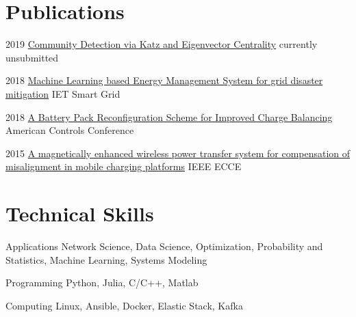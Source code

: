\documentclass{tccv}
\begin{document}
\section{Publications}
\begin{yearlist}
	\item{2019}
	{\href{https://arxiv.org/abs/1909.03916}{Community Detection via Katz and Eigenvector Centrality}}
	{currently unsubmitted}
	
	\item{2018}
	{\href{https://digital-library.theiet.org/content/journals/10.1049/iet-stg.2018.0043}{Machine Learning based Energy Management System for grid disaster mitigation}}
	{IET Smart Grid}
	
	\item{2018}
	{\href{https://ieeexplore.ieee.org/document/8431612}{A Battery Pack Reconfiguration Scheme for Improved Charge Balancing}}
	{American Controls Conference}
	
	\item{2015}
	{\href{http://ieeexplore.ieee.org/document/7309840/}{A magnetically enhanced wireless power transfer system for compensation of misalignment in mobile charging platforms}}
	{IEEE ECCE}
	
\end{yearlist}

\section{Technical Skills}
\begin{factlist}
\item {Applications}
	{Network Science, Data Science, Optimization, Probability and Statistics, Machine Learning, Systems Modeling}

\item{Programming}
    {Python, Julia, C/C++, Matlab}
    
\item{Computing}
     {Linux, Ansible, Docker, Elastic Stack, Kafka}



\end{factlist}
\end{document}
